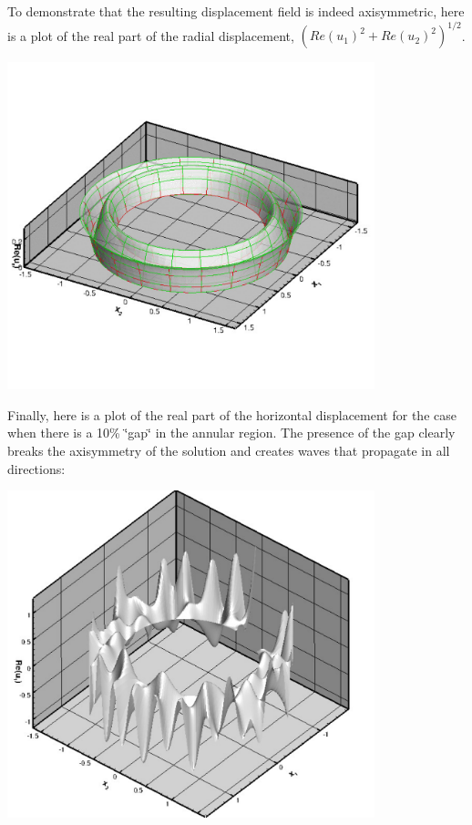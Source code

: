 To demonstrate that the resulting displacement field is indeed axisymmetric, here is a plot of the real part of the radial displacement, $ ( Re(u_1)^2 + Re(u_2)^2 )^{1/2} $.

 
\begin{DoxyImage}
\includegraphics[width=0.8\textwidth]{re_ur}
\end{DoxyImage}


Finally, here is a plot of the real part of the horizontal displacement for the case when there is a 10\% \char`\"{}gap\char`\"{} in the annular region. The presence of the gap clearly breaks the axisymmetry of the solution and creates waves that propagate in all directions\+:

 
\begin{DoxyImage}
\includegraphics[width=0.8\textwidth]{re_ux_hole}
\end{DoxyImage}


